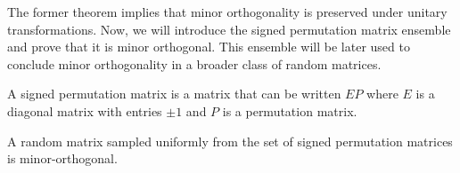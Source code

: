The former theorem implies that minor orthogonality is preserved under unitary transformations. Now, we will introduce the signed permutation matrix ensemble and prove that it is minor orthogonal. This ensemble will be later used to conclude minor orthogonality in a broader class of random matrices.

\begin{definition}
    A signed permutation matrix is a matrix that can be written $EP$ where $E$ is a diagonal matrix with entries $\pm 1$ and $P$ is a permutation matrix.
\end{definition}

\begin{lemma} \label{lemma:singed_per_is_minorth}
    A random matrix sampled uniformly from the set of signed permutation matrices is minor-orthogonal.
\end{lemma}

